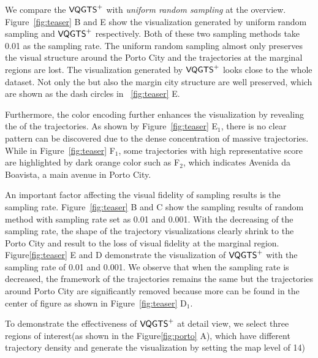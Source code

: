 We compare the $\mathsf{VQGTS}^{+}$ with \textit{uniform random sampling} at the overview.
Figure~\ref{fig:teaser} B and E show the visualization generated by uniform random sampling and $\mathsf{VQGTS}^{+}$ respectively. Both of these two sampling methods take 0.01 as the sampling rate. The uniform random sampling almost only preserves the visual structure around the Porto City and the trajectories at the marginal regions are lost.
The visualization generated by $\mathsf{VQGTS}^{+}$ looks close to the whole dataset. Not only the  but also the margin city structure are well preserved, which are shown as the dash circles in ~\ref{fig:teaser} E.

Furthermore, the color encoding further enhances the visualization by revealing the  of the trajectories.
As shown by Figure~\ref{fig:teaser} E$_1$, there is no clear pattern can be discovered due to the dense concentration of massive trajectories. While in Figure~\ref{fig:teaser} F$_1$, some trajectories with high representative score are highlighted by dark orange color such as F$_2$, which indicates Avenida da Boavista, a main avenue in Porto City.


An important factor affecting the visual fidelity of sampling results is the sampling rate. Figure~\ref{fig:teaser} B and C show the sampling results of random method with sampling rate set as 0.01 and 0.001. With the decreasing of the sampling rate, the shape of the trajectory visualizations clearly shrink to the Porto City and result to the loss of visual fidelity at the marginal region. Figure\ref{fig:teaser} E and D demonstrate the visualization of $\mathsf{VQGTS}^{+}$ with the sampling rate of 0.01 and 0.001. We observe that when the sampling rate is decreased, the framework of the trajectories remains the same but the trajectories around Porto City are significantly removed because more  can be found in the center of figure as shown in Figure~\ref{fig:teaser} D$_1$.

To demonstrate the effectiveness of $\mathsf{VQGTS}^{+}$ at detail view, we select three regions of interest(as shown in the Figure\ref{fig:porto} A), which have different trajectory density and generate the visualization by setting the map level of 14)

